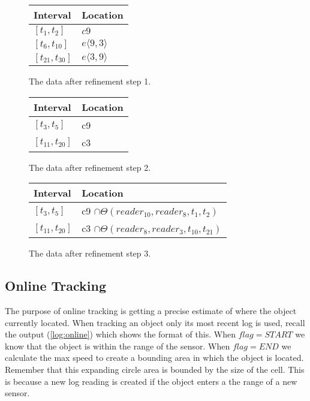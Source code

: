 \begin{figure}
\begin{minipage}[tbh]{\columnwidth}

  \vspace*{\fill}
  \centering
		\begin{tabular}{ l  l  }
		\toprule
		\textbf{Interval} & \textbf{Location}\\ 
		\midrule
		$[t_1,t_2]$ & $c9$ \\ 

		$[t_6,t_{10}]$ &  $e\langle9,3\rangle$\\ 

		$[t_{21},t_{30}]$ &  $ e\langle3,9\rangle $\\ 
		\bottomrule
		\end{tabular}
  \caption{The data after refinement step 1.}
  \label{fig:ref1} \par\vfill
	
	
		\begin{tabular}{  l  l  }
		\toprule
		\textbf{Interval} & \textbf{Location}\\ 
		\midrule
		$[t_3,t_5]$ & c9 \\ 

		$[t_{11},t_{20}]$ &  c3\\ 
		\bottomrule
		\end{tabular}
  \caption{The data after refinement step 2.}
  \label{fig:ref2}
	
		\begin{tabular}{  l  l  }
		\toprule
		\textbf{Interval} & \textbf{Location}\\ 
		\midrule
		$[t_3,t_5]$ & c9 $\cap \Theta(reader_10,reader_8,t_1,t_2)$ \\ 

		$[t_{11},t_{20}]$ &  c3 $\cap \Theta(reader_8,reader_3,t_{10},t_{21})$\\ 
		\hline
		\end{tabular}
			
	\caption{The data after refinement step 3.}
  \label{fig:ref3}

\end{minipage}
\end{figure}


\subsection{Online Tracking}
\label{sub:online}
The purpose of online tracking is getting a precise estimate of where the object currently located.
When tracking an object only its most recent log is used, recall the output (\ref{log:online}) which shows the format of this.
When $flag=START$ we know that the object is within the range of the sensor.
When $flag=END$ we calculate the max speed to create a bounding area in which the object is located. Remember that this expanding circle area is bounded by the size of the cell. 
This is because a new log reading is created if the object enters a the range of a new sensor.

